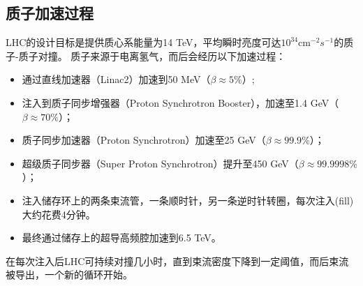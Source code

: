 \subsection{质子加速过程}
LHC的设计目标是提供质心系能量为14 TeV，平均瞬时亮度可达$10^{34} \text{cm}^{-2}s^{-1}$的质子-质子对撞。
质子来源于电离氢气，而后会经历以下加速过程：
\begin{itemize}
  \item 通过直线加速器（Linac2）加速到50 MeV（$\beta\approx5\%$）;
  \item 注入到质子同步增强器（Proton Synchrotron Booster），加速至1.4 GeV（$\beta\approx70\%$）；
  \item 质子同步加速器（Proton Synchrotron）加速至25 GeV（$\beta\approx99.9\%$）；
  \item 超级质子同步器（Super Proton Synchrotron）提升至450 GeV（$\beta\approx99.9998\%$）；
  \item 注入储存环上的两条束流管，一条顺时针，另一条逆时针转圈，每次注入(fill)大约花费4分钟。
  \item 最终通过储存上的超导高频腔加速到6.5 TeV。
\end{itemize}
在每次注入后LHC可持续对撞几小时，直到束流密度下降到一定阈值，而后束流被导出，一个新的循环开始。

